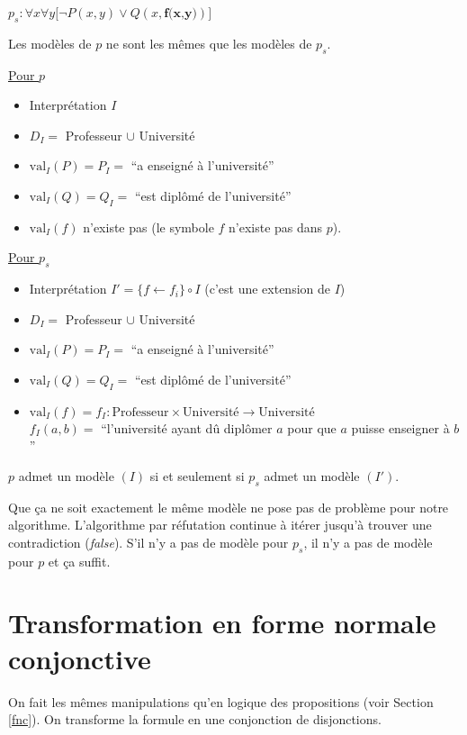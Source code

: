 {$p_s: \forall x \forall y \big[ \neg P(x,y) \vee Q(x,\textbf{f(x,y)}) \big]$
\smallskip

Les modèles de $p$ ne sont les mêmes que les modèles de $p_s$.

\underline{Pour $p$}
\begin{itemize}
  \item Interprétation $I$
  \item $D_I =$ Professeur $\cup$ Université
  \item $\mathrm{val}_I(P) = P_I = $ ``a enseigné à l'université''
  \item $\mathrm{val}_I(Q) = Q_I = $ ``est diplômé de l'université''
  \item $\mathrm{val}_I(f)$ n'existe pas (le symbole $f$ n'existe pas dans $p$).
\end{itemize}

\vspace{\baselineskip}

\underline{Pour $p_s$}
\begin{itemize}
  \item Interprétation $I' = \{ f \leftarrow f_i \} \circ I$ (c'est une extension de $I$)
  \item $D_I =$ Professeur $\cup$ Université
  \item $\mathrm{val}_I(P) = P_I = $ ``a enseigné à l'université''
  \item $\mathrm{val}_I(Q) = Q_I = $ ``est diplômé de l'université''
  \item $\mathrm{val}_I(f) = f_I : \mathrm{Professeur} \times \mathrm{Université} \rightarrow \mathrm{Université}$ \\
  $f_I(a,b) = $ ``l'université ayant dû diplômer $a$ pour que $a$ puisse enseigner à $b$''
\end{itemize}

$p$ admet un modèle $(I)$ si et seulement si $p_s$ admet un modèle $(I')$.

Que ça ne soit exactement le même modèle ne pose pas de problème pour notre algorithme. L'algorithme par réfutation continue à itérer jusqu'à trouver une contradiction ({\em false}). S'il n'y a pas de modèle pour $p_s$, il n'y a pas de modèle pour $p$ et ça suffit.

\section{Transformation en forme normale conjonctive}

On fait les
mêmes manipulations qu'en logique des propositions (voir Section \ref{fnc}).
On transforme la formule en une conjonction de disjonctions.

}
